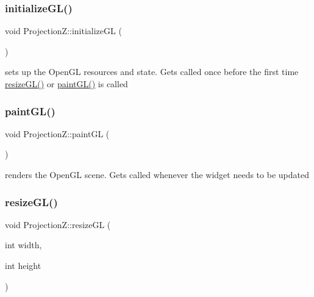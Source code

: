 \subsubsection{\texorpdfstring{initialize\+G\+L()}{initializeGL()}}
{\footnotesize\ttfamily void Projection\+Z\+::initialize\+GL (\begin{DoxyParamCaption}{ }\end{DoxyParamCaption})\hspace{0.3cm}{\ttfamily [protected]}}



sets up the Open\+GL resources and state. Gets called once before the first time \mbox{\hyperlink{class_projection_z_a5f276e00f3680aa3ec663030e74df160}{resize\+G\+L()}} or \mbox{\hyperlink{class_projection_z_a192e7a4a75e41e9d2c411eb252c2d2d6}{paint\+G\+L()}} is called 

\mbox{\label{class_projection_z_a192e7a4a75e41e9d2c411eb252c2d2d6}} 
\subsubsection{\texorpdfstring{paint\+G\+L()}{paintGL()}}
{\footnotesize\ttfamily void Projection\+Z\+::paint\+GL (\begin{DoxyParamCaption}{ }\end{DoxyParamCaption})\hspace{0.3cm}{\ttfamily [protected]}}



renders the Open\+GL scene. Gets called whenever the widget needs to be updated 

\mbox{\label{class_projection_z_a5f276e00f3680aa3ec663030e74df160}} 
\subsubsection{\texorpdfstring{resize\+G\+L()}{resizeGL()}}
{\footnotesize\ttfamily void Projection\+Z\+::resize\+GL (\begin{DoxyParamCaption}\item[{int}]{width,  }\item[{int}]{height }\end{DoxyParamCaption})\hspace{0.3cm}{\ttfamily [protected]}}



